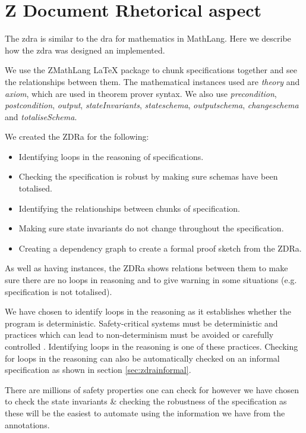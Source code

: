 \chapter{Z Document Rhetorical aspect}
\label{ch:zdra}
The \gls{zdra} is similar to the \gls{dra} for mathematics in MathLang. Here we describe how
the \gls{zdra} was designed an implemented. 

We use the ZMathLang \LaTeX{} package to chunk specifications together and see
the relationships between them. The mathematical instances used are
\textit{theory} and \textit{axiom}, which are used in theorem prover syntax. We
also use \textit{precondition}, \textit{postcondition}, \textit{output},
\textit{stateInvariants}, \textit{stateschema}, \textit{outputschema},
\textit{changeschema} and \textit{totaliseSchema}.

We created the ZDRa for the following:

\begin{itemize}

\item Identifying loops in the reasoning of specifications.
\item Checking the specification is robust by making sure schemas have been
totalised.
\item Identifying the relationships between chunks of specification.
\item Making sure state invariants do not change throughout the specification.
\item Creating a dependency graph to create a formal proof sketch from the ZDRa.
\end{itemize}

As well as having instances, the ZDRa shows relations between them to make sure
there are no loops in reasoning and to give warning in some situations (e.g.
specification is not totalised).

We have chosen to identify loops in the reasoning as it establishes whether the
program is deterministic. Safety-critical systems must be deterministic and
practices which can lead to non-determinism must be avoided or carefully
controlled \cite{rierson2013developing}. Identifying loops in the reasoning is
one of these practices. Checking for loops in the reasoning can also be
automatically checked on an informal specification as shown in section \ref{sec:zdrainformal}.

There are millions of safety properties one can check for however we have chosen
to check the state invariants \& checking the robustness of the specification as
these will be the easiest to automate using the information we have from the
annotations.

